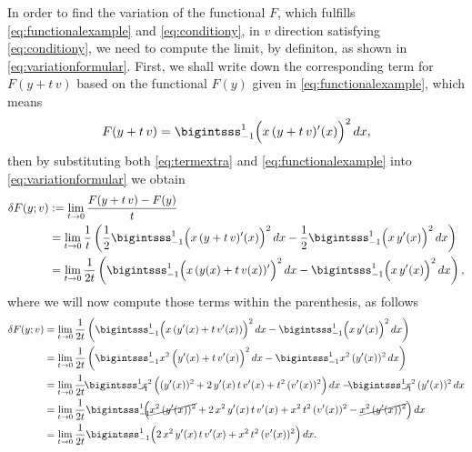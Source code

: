 \documentclass[12pt]{article}
\begin{document}
In order to find the variation of the functional $F$,
which fulfills 
\eqref{eq:functionalexample}
and 
\eqref{eq:conditiony},
in $v$ direction satisfying
\eqref{eq:conditiony}, 
we need to compute the limit, by definiton,
as shown in \eqref{eq:variationformular}.
First, we shall write down the corresponding term 
for $F(y+t\,v)$ based on
the functional $F(y)$ given in
\eqref{eq:functionalexample}, which means
\begin{align}
	\label{eq:termextra}
	F(y+t\,v)
	= 
	\bigintsss_{-1}^{1}
	\Big(
	x \,
	(y+t\,v)^\prime(x)
	\Big)^2\,dx,
\end{align}
then by substituting both \eqref{eq:termextra}
and \eqref{eq:functionalexample}
into \eqref{eq:variationformular}
we obtain 
\begin{align}
	\delta F(y;v)
	 & :=  \lim_{t\to 0}\frac{F(y+t\,v)-F(y)}{t} \notag \\
	 & =  \lim_{t\to 0} \frac{1}{t}
	\left(
	\frac{1}{2}
	\bigintsss_{-1}^{1}
	\Big(
	x \,
	(y+t\,v)^\prime(x)
	\Big)^2\,dx
	-
	\frac{1}{2}
	\bigintsss_{-1}^{1}
	\Big(
	x \, y^\prime(x)
	\Big)^2\,dx
	\right)\notag                                       \\
	 & =  \lim_{t\to 0} \frac{1}{2t}
	\left(
	\bigintsss_{-1}^{1}
	\Big(
	x \,
	(y(x)+t\,v(x))^\prime
	\Big)^2\,dx
	-
	\bigintsss_{-1}^{1}
	\Big(
	x \, y^\prime(x)
	\Big)^2\,dx
	\right), 
\end{align}
where we will now compute those terms within the parenthesis, as follows
\begin{align}
	\delta F(y;v)
	 & =  \lim_{t\to 0} \frac{1}{2t}
	\left(
	\bigintsss_{-1}^{1}
	\Big(
	x \,
	(y^\prime(x)+t\,v^\prime(x))
	\Big)^2\,dx
	-
	\bigintsss_{-1}^{1}
	\Big(
	x \, y^\prime(x)
	\Big)^2\,dx
	\right)\notag                    \\
	 & =  \lim_{t\to 0} \frac{1}{2t}
	\left(
	\bigintsss_{-1}^{1}
	x^2 \,
	\Big(y^\prime(x)+t\,v^\prime(x)\Big)^2
	\,dx
	-
	\bigintsss_{-1}^{1}
	x^2 \, (y^\prime(x))^2\,dx
	\right)\notag                    \\
	 & =  \lim_{t\to 0} \frac{1}{2t}
	\!
	\bigintsss_{-1}^{1}
	\!\!\!\!
	x^2 \,
	\Big(
	(y^\prime(x))^2 
	+ 2\,y^\prime(x)\,t\,v^\prime(x)
	+ t^2\,(v^\prime(x))^2
	\Big)
	\,dx
	-\!\!\!
	\bigintsss_{-1}^{1}
	\!\!\!\!
	x^2 \, (y^\prime(x))^2\,dx\notag \\
	 & =  \lim_{t\to 0} \frac{1}{2t}
	\bigintsss_{-1}^{1}
	\!\!\!\!
	\Big(
	\cancel{x^2\,(y^\prime(x))^2}
	+ 2\,x^2\,y^\prime(x)\,t\,v^\prime(x)
	+ x^2\,t^2\,(v^\prime(x))^2
	- \cancel{x^2\,(y^\prime(x))^2}
	\Big)
	\,dx
	\notag                           \\
	 & =  \lim_{t\to 0} \frac{1}{2t}
	\bigintsss_{-1}^{1}
	\Big(
	2\,x^2\,y^\prime(x)\,t\,v^\prime(x)
	+ x^2\,t^2\,(v^\prime(x))^2
	\Big)
	\,dx.
	\label{eq:reducedform}
\end{align}
\end{document}
